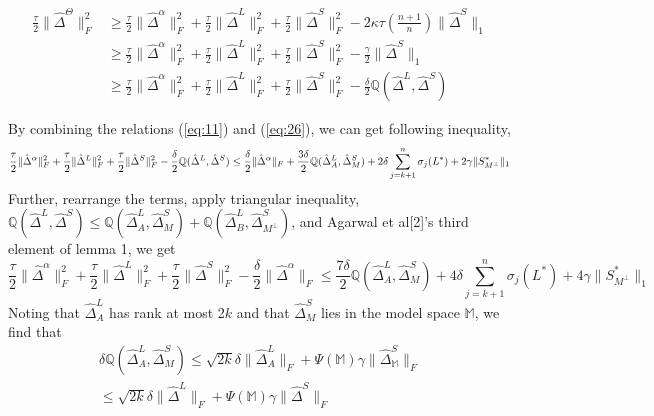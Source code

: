 \documentclass{article}
\begin{document}
\begin{align}
    \frac{\tau}{2}\|\hat{\Delta}^{\Theta}\|_{F}^{2} 
    &\geq \frac{\tau}{2} \|\hat{\Delta}^{\alpha}\|_{F}^{2} + \frac{\tau}{2} \|\hat{\Delta}^{L}\|_{F}^{2} + \frac{\tau}{2} \|\hat{\Delta}^{S}\|_{F}^{2} 
    - 2\kappa\tau(\frac{n+1}{n})\|\hat{\Delta}^{S}\|_{1} \\
    &\geq \frac{\tau}{2} \|\hat{\Delta}^{\alpha}\|_{F}^{2} + \frac{\tau}{2} \|\hat{\Delta}^{L}\|_{F}^{2} + \frac{\tau}{2} \|\hat{\Delta}^{S}\|_{F}^{2} - \frac{\gamma}{2}\|\hat{\Delta}^{S}\|_{1}\\
    &\geq \frac{\tau}{2} \|\hat{\Delta}^{\alpha}\|_{F}^{2} + \frac{\tau}{2} \|\hat{\Delta}^{L}\|_{F}^{2} + \frac{\tau}{2} \|\hat{\Delta}^{S}\|_{F}^{2} - \frac{\delta}{2} \mathbb{Q}(\hat{\Delta}^L,\hat{\Delta}^S) \label{eq:26}
\end{align}

By combining the relations (\ref{eq:11}) and (\ref{eq:26}), we can get following inequality, 
\[
    \frac{\tau}{2} \|\hat{\Delta}^{\alpha}\|_{F}^{2} + \frac{\tau}{2} \|\hat{\Delta}^{L}\|_{F}^{2} + \frac{\tau}{2} \|\hat{\Delta}^{S}\|_{F}^{2} - \frac{\delta}{2} \mathbb{Q}(\hat{\Delta}^L,\hat{\Delta}^S)\\
    \leq \frac{\delta}{2}\|\hat{\Delta}^{\alpha}\|_{F} + 
    \frac{3\delta}{2}\mathbb{Q}(\hat{\Delta}^L_{A},\hat{\Delta}^S_{M}) +2 \delta \sum_{j=k+1}^{n} \sigma_{j}(L^{*}) + 2\gamma \|S^{*}_{M^\perp}\|_{1}
\]
Further, rearrange the terms, apply triangular inequality, $\mathbb{Q}(\hat{\Delta}^L,\hat{\Delta}^S)\leq \mathbb{Q}(\hat{\Delta}^L_{A},\hat{\Delta}^S_{M}) + \mathbb{Q}(\hat{\Delta}^L_{B},\hat{\Delta}^S_{M^{\perp}})$, and Agarwal et al[2]’s third element of lemma 1, we get 
\[
    \frac{\tau}{2} \|\hat{\Delta}^{\alpha}\|_{F}^{2} + \frac{\tau}{2} \|\hat{\Delta}^{L}\|_{F}^{2} + \frac{\tau}{2} \|\hat{\Delta}^{S}\|_{F}^{2} -
    \frac{\delta}{2}\|\hat{\Delta}^{\alpha}\|_{F} 
    \leq 
    \frac{7\delta}{2}\mathbb{Q}(\hat{\Delta}^L_{A},\hat{\Delta}^S_{M}) + 4 \delta \sum_{j=k+1}^{n} \sigma_{j}(L^*) + 4\gamma \|S^*_{M^\perp}\|_{1}
\]
Noting that $\hat{\Delta}^{L}_{A}$ has rank at most 2$k$ and that $\hat{\Delta}^{S}_{M}$ lies in the model space $\mathbb{M}$, we find that
\begin{align}
    \delta\mathbb{Q}(\hat{\Delta}^L_{A},\hat{\Delta}^S_{M}) 
    \leq \sqrt{2k}\delta\|\hat{\Delta}^L_{A}\|_{F} + \Psi(\mathbb{M})\gamma\|\hat{\Delta}^S_\mathbb{M}\|_{F}\\
    \leq \sqrt{2k}\delta\|\hat{\Delta}^L\|_{F} + \Psi(\mathbb{M})\gamma\|\hat{\Delta}^S\|_{F}
\end{align}
\end{document}
